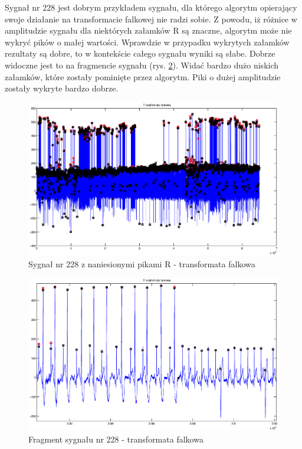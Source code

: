 \begin{itemize}
\begin{enumerate}[I.]
Sygnał nr 228 jest dobrym przykładem sygnału, dla którego algorytm opierający swoje działanie na transformacie falkowej nie radzi sobie. Z powodu, iż różnice w amplitudzie sygnału dla niektórych załamków R są znaczne, algorytm może nie wykryć pików o małej wartości. Wprawdzie w przypadku wykrytych załamków rezultaty są dobre, to w kontekście całego sygnału wyniki są słabe. Dobrze widoczne jest to na fragmencie sygnału (rys. \ref{fig:228WF}). Widać bardzo dużo niskich załamków, które zostały pominięte przez algorytm. Piki o dużej amplitudzie zostały wykryte bardzo dobrze.
\newpage
\begin{figure}[H]
\centering
\includegraphics[scale=0.35]{R_PEAKS/wektorowe/228_falka_calosc.eps}
\caption{Sygnał nr 228 z naniesionymi pikami R - transformata falkowa}
\label{fig:228WC}
\end{figure}

\begin{figure}[H]
\centering
\includegraphics[scale=0.35]{R_PEAKS/wektorowe/228_falka_fragment.eps}
\caption{Fragment sygnału nr 228 - transformata falkowa}
\label{fig:228WF}
\end{figure}
\end{enumerate}
\end{itemize}
\newpage
